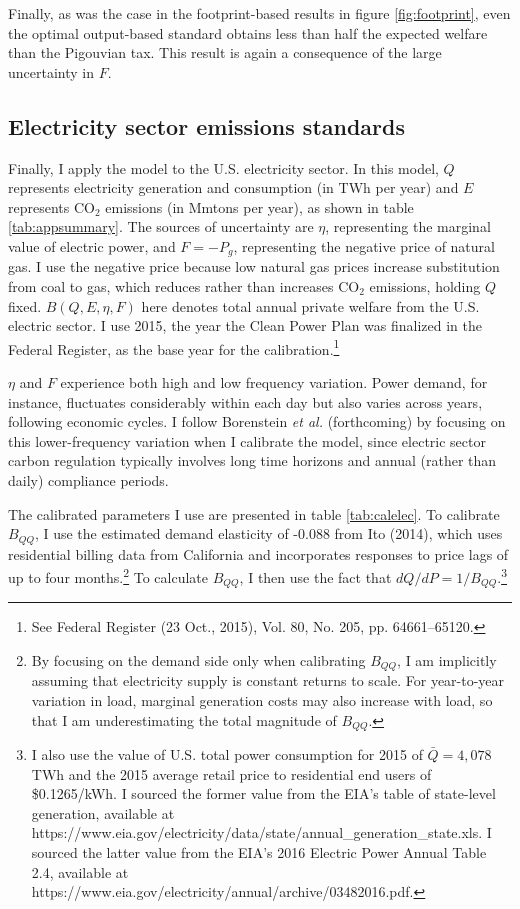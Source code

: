 \documentclass[12pt]{article}
\begin{document}
Finally, as was the case in the footprint-based results in figure \ref{fig:footprint}, even the optimal output-based standard obtains less than half the expected welfare than the Pigouvian tax. This result is again a consequence of the large uncertainty in $F$.



\subsection{Electricity sector emissions standards} \label{sec:elec}
Finally, I apply the model to the U.S. electricity sector. In this model, $Q$ represents electricity generation and consumption (in TWh per year) and $E$ represents CO$_2$ emissions (in Mmtons per year), as shown in table \ref{tab:appsummary}. The sources of uncertainty are $\eta$, representing the marginal value of electric power, and $F=-P_g$, representing the negative price of natural gas. I use the negative price because low natural gas prices increase substitution from coal to gas, which reduces rather than increases CO$_2$ emissions, holding $Q$ fixed. $B(Q,E,\eta,F)$ here denotes total annual private welfare from the U.S. electric sector. I use 2015, the year the Clean Power Plan was finalized in the Federal Register, as the base year for the calibration.\footnote{See Federal Register (23 Oct., 2015), Vol. 80, No. 205, pp. 64661--65120.}

$\eta$ and $F$ experience both high and low frequency variation. Power demand, for instance, fluctuates considerably within each day but also varies across years, following economic cycles. I follow Borenstein {\it et al.} (forthcoming) by focusing on this lower-frequency variation when I calibrate the model, since electric sector carbon regulation typically involves long time horizons and annual (rather than daily) compliance periods.

The calibrated parameters I use are presented in table \ref{tab:calelec}. To calibrate $B_{QQ}$, I use the estimated demand elasticity of -0.088 from Ito (2014), which uses residential billing data from California and incorporates responses to price lags of up to four months.\footnote{By focusing on the demand side only when calibrating $B_{QQ}$, I am implicitly assuming that electricity supply is constant returns to scale. For year-to-year variation in load, marginal generation costs may also increase with load, so that I am underestimating the total magnitude of $B_{QQ}$.} To calculate $B_{QQ}$, I then use the fact that $dQ/dP=1/B_{QQ}$.\footnote{I also use the value of U.S. total power consumption for 2015 of $\bar{Q}=4,078$ TWh and the 2015 average retail price to residential end users of \$0.1265/kWh. I sourced the former value from the EIA's table of state-level generation, available at https://www.eia.gov/electricity/data/state/annual\_generation\_state.xls. I sourced the latter value from the EIA's 2016 Electric Power Annual Table 2.4, available at https://www.eia.gov/electricity/annual/archive/03482016.pdf.}
\end{document}
